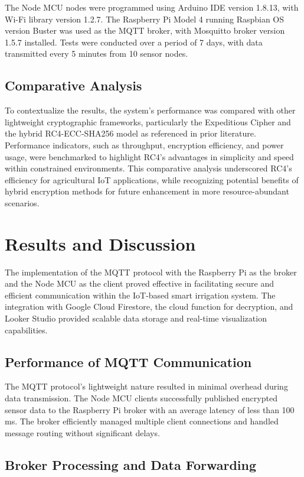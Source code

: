 \documentclass[conference]{IEEEtran}
\begin{document}
The Node MCU nodes were programmed using Arduino IDE version 1.8.13, with Wi-Fi library version 1.2.7. The Raspberry Pi Model 4 running Raspbian OS version Buster was used as the MQTT broker, with Mosquitto broker version 1.5.7 installed. Tests were conducted over a period of 7 days, with data transmitted every 5 minutes from 10 sensor nodes.

\subsection{Comparative Analysis}
To contextualize the results, the system's performance was compared with other lightweight cryptographic frameworks, particularly the Expeditious Cipher and the hybrid RC4-ECC-SHA256 model as referenced in prior literature. Performance indicators, such as throughput, encryption efficiency, and power usage, were benchmarked to highlight RC4's advantages in simplicity and speed within constrained environments. This comparative analysis underscored RC4's efficiency for agricultural IoT applications, while recognizing potential benefits of hybrid encryption methods for future enhancement in more resource-abundant scenarios.

\section{Results and Discussion}

The implementation of the MQTT protocol with the Raspberry Pi as the broker and the Node MCU as the client proved effective in facilitating secure and efficient communication within the IoT-based smart irrigation system. The integration with Google Cloud Firestore, the cloud function for decryption, and Looker Studio provided scalable data storage and real-time visualization capabilities.

\subsection{Performance of MQTT Communication}

The MQTT protocol's lightweight nature resulted in minimal overhead during data transmission. The Node MCU clients successfully published encrypted sensor data to the Raspberry Pi broker with an average latency of less than 100 ms. The broker efficiently managed multiple client connections and handled message routing without significant delays.

\subsection{Broker Processing and Data Forwarding}
\end{document}
